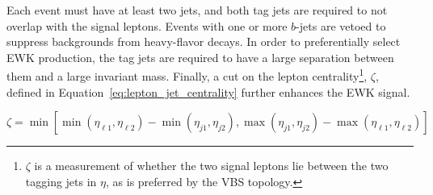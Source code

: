 Each event must have at least two jets, and both tag jets are required to not overlap with the signal leptons.
Events with one or more $b$-jets are vetoed to suppress backgrounds from heavy-flavor decays.
In order to preferentially select EWK production, the tag jets are required to have a large separation between them and a large invariant mass.
Finally, a cut on the lepton centrality\footnote{$\zeta$ is a measurement of whether the two signal leptons lie between the two tagging jets in $\eta$, as is preferred by the VBS topology.}, $\zeta$, defined in Equation~\ref{eq:lepton_jet_centrality} further enhances the EWK \ssww signal.

\begin{equation}
\zeta = \min [\min (\eta_{\ell1}, \eta_{\ell2} )-\min(\eta_{j1},\eta_{j2}), \max(\eta_{j1},\eta_{j2})-\max(\eta_{\ell1},\eta_{\ell2}) ]
\label{eq:lepton_jet_centrality}
\end{equation}

